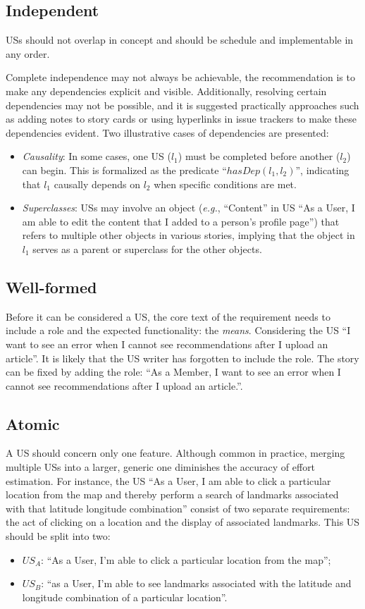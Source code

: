 \subsection*{\normalsize{Independent}}
USs should not overlap in concept and should be schedule and implementable in any order. 

Complete independence may not always be achievable, the recommendation is to make any dependencies explicit and visible. Additionally, resolving certain dependencies may not be possible, and it is suggested practically approaches such as adding notes to story cards or using hyperlinks in issue trackers to make these dependencies evident. Two illustrative cases of dependencies are presented:
\begin{itemize}
\item 	\emph{Causality}: In some cases, one US ($l_1$) must be completed before another ($l_2$) can begin. This is formalized as the predicate \enquote{$hasDep(l_1, l_2)$}, indicating that $ l_1$ causally depends on $l_2$ when specific conditions are met.
\item 	\emph{Superclasses}: USs may involve an object (\emph{e.g.}, \enquote{Content} in US \enquote{As a User, I am able to edit the content that I added to a person’s profile page}) that refers to multiple other objects in various stories, implying that the object in $l_1$ serves as a parent or superclass for the other objects.
\end{itemize}
\subsection*{\normalsize{Well-formed}}
Before it can be considered a US, the core text of the requirement needs to include a role and the expected functionality: the \emph{means}. Considering the US \enquote{I want to see an error when I cannot see recommendations after I upload an article}. It is likely that the US writer has forgotten to include the role. The story can be fixed by adding the role: \enquote{As a Member, I want to see an error when I cannot see recommendations after I upload an article.}.
\subsection*{\normalsize{Atomic}}
A US should concern only one feature. Although common in practice, merging multiple USs into a larger, generic one diminishes the accuracy of effort estimation\cite{liskin2014we}. For instance, the US \enquote{As a User, I am able to click a particular location from the map and thereby perform a search of landmarks associated with that latitude longitude combination} consist of two separate requirements: the act of clicking on a location and the display of associated landmarks. This US should be split into two:
\begin{itemize}
\item $US_A$: \enquote{As a User, I’m able to click a particular location from the map};
\item $US_B$: \enquote{as a User, I’m able to see landmarks associated with the latitude and longitude combination of a particular location}.
\end{itemize}

